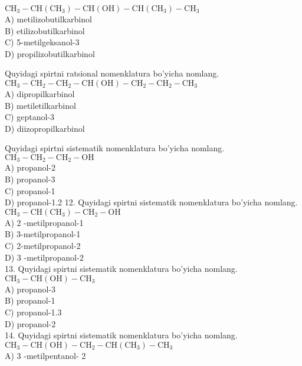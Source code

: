 $\mathrm{CH}_{3}-\mathrm{CH}\left(\mathrm{CH}_{3}\right)-\mathrm{CH}(\mathrm{OH})-\mathrm{CH}\left(\mathrm{CH}_{3}\right)-\mathrm{CH}_{3}$\\
A) metilizobutilkarbinol\\
B) etilizobutilkarbinol\\
C) 5-metilgeksanol-3\\
D) propilizobutilkarbinol
  \item Quyidagi spirtni ratsional nomenklatura bo'yicha nomlang.\\
$\mathrm{CH}_{3}-\mathrm{CH}_{2}-\mathrm{CH}_{2}-\mathrm{CH}(\mathrm{OH})-\mathrm{CH}_{2}-\mathrm{CH}_{2}-\mathrm{CH}_{3}$\\
A) dipropilkarbinol\\
B) metiletilkarbinol\\
C) geptanol-3\\
D) diizopropilkarbinol
  \item Quyidagi spirtni sistematik nomenklatura bo'yicha nomlang.\\
$\mathrm{CH}_{3}-\mathrm{CH}_{2}-\mathrm{CH}_{2}-\mathrm{OH}$\\
A) propanol-2\\
B) propanol-3\\
C) propanol-1\\
D) propanol-1.2
12. Quyidagi spirtni sistematik nomenklatura bo'yicha nomlang.\\
$\mathrm{CH}_{3}-\mathrm{CH}\left(\mathrm{CH}_{3}\right)-\mathrm{CH}_{2}-\mathrm{OH}$\\
A) 2 -metilpropanol-1\\
B) 3-metilpropanol-1\\
C) 2-metilpropanol-2\\
D) 3 -metilpropanol-2\\
13. Quyidagi spirtni sistematik nomenklatura bo'yicha nomlang.\\
$\mathrm{CH}_{3}-\mathrm{CH}(\mathrm{OH})-\mathrm{CH}_{3}$\\
A) propanol-3\\
B) propanol-1\\
C) propanol-1.3\\
D) propanol-2\\
14. Quyidagi spirtni sistematik nomenklatura bo'yicha nomlang.\\
$\mathrm{CH}_{3}-\mathrm{CH}(\mathrm{OH})-\mathrm{CH}_{2}-\mathrm{CH}\left(\mathrm{CH}_{3}\right)-\mathrm{CH}_{3}$\\
A) 3 -metilpentanol- 2\\
